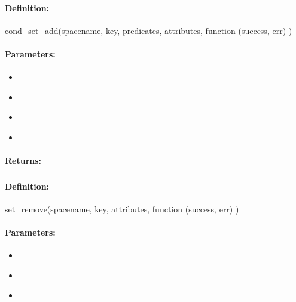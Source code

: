 \paragraph{Definition:}
\begin{javascriptcode}
cond_set_add(spacename, key, predicates, attributes, function (success, err) {})
\end{javascriptcode}
\paragraph{Parameters:}
\begin{itemize}[noitemsep]
\item {}\\

\item {}\\

\item {}\\

\item {}\\

\end{itemize}

\paragraph{Returns:}


\pagebreak
\subsubsection{}
\label{api:nodejs:set_remove}


\paragraph{Definition:}
\begin{javascriptcode}
set_remove(spacename, key, attributes, function (success, err) {})
\end{javascriptcode}
\paragraph{Parameters:}
\begin{itemize}[noitemsep]
\item {}\\

\item {}\\

\item {}\\

\end{itemize}

